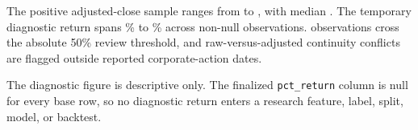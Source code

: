 
The positive adjusted-close sample ranges from \PriceMin{} to \PriceMax{}, with median \PriceMedian{}. The temporary diagnostic return spans \DiagnosticMin{}\% to \DiagnosticMax{}\% across \DiagnosticRows{} non-null observations. \ExtremeReturns{} observations cross the absolute 50\% review threshold, and \RawAdjustedConflicts{} raw-versus-adjusted continuity conflicts are flagged outside reported corporate-action dates.

The diagnostic figure is descriptive only. The finalized \texttt{pct\_return} column is null for every base row, so no diagnostic return enters a research feature, label, split, model, or backtest.
